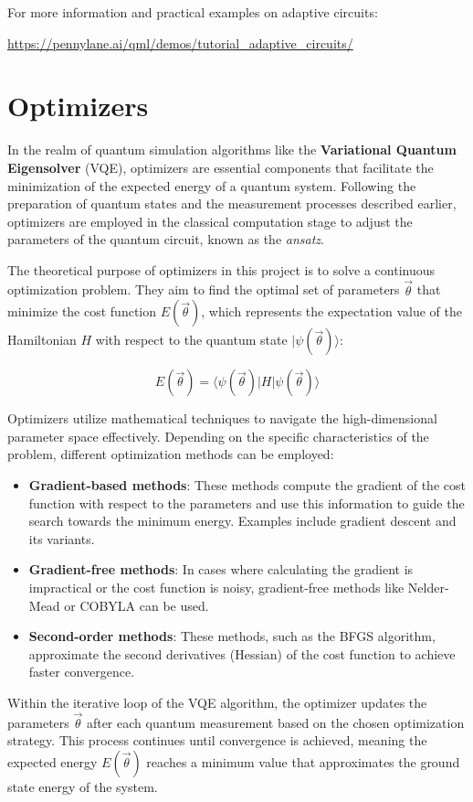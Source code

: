 For more information and practical examples on adaptive circuits:

\url{https://pennylane.ai/qml/demos/tutorial_adaptive_circuits/}

\section{Optimizers}

In the realm of quantum simulation algorithms like the \textbf{Variational Quantum Eigensolver} (VQE), optimizers are essential components that facilitate the minimization of the expected energy of a quantum system. Following the preparation of quantum states and the measurement processes described earlier, optimizers are employed in the classical computation stage to adjust the parameters of the quantum circuit, known as the \textit{ansatz}.

The theoretical purpose of optimizers in this project is to solve a continuous optimization problem. They aim to find the optimal set of parameters \(\vec{\theta}\) that minimize the cost function \(E(\vec{\theta})\), which represents the expectation value of the Hamiltonian \(H\) with respect to the quantum state \(| \psi(\vec{\theta}) \rangle\):

\[
E(\vec{\theta}) = \langle \psi(\vec{\theta}) | H | \psi(\vec{\theta}) \rangle
\]

Optimizers utilize mathematical techniques to navigate the high-dimensional parameter space effectively. Depending on the specific characteristics of the problem, different optimization methods can be employed:

\begin{itemize}
    \item \textbf{Gradient-based methods}: These methods compute the gradient of the cost function with respect to the parameters and use this information to guide the search towards the minimum energy. Examples include gradient descent and its variants.
    \item \textbf{Gradient-free methods}: In cases where calculating the gradient is impractical or the cost function is noisy, gradient-free methods like Nelder-Mead or COBYLA can be used.
    \item \textbf{Second-order methods}: These methods, such as the BFGS algorithm, approximate the second derivatives (Hessian) of the cost function to achieve faster convergence.
\end{itemize}

Within the iterative loop of the VQE algorithm, the optimizer updates the parameters \(\vec{\theta}\) after each quantum measurement based on the chosen optimization strategy. This process continues until convergence is achieved, meaning the expected energy \(E(\vec{\theta})\) reaches a minimum value that approximates the ground state energy of the system.

